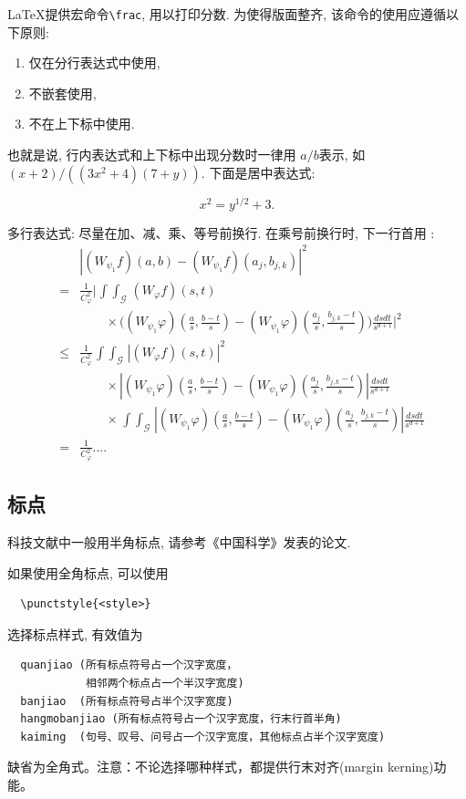\LaTeX 提供宏命令\verb+\frac+, 用以打印分数. 为使得版面整齐, 该命令的使用应遵循以下原则:

\begin{enumerate}
\item 仅在分行表达式中使用,
\item 不嵌套使用,
\item 不在上下标中使用.
\end{enumerate}

也就是说, 行内表达式和上下标中出现分数时一律用 $a/b$表示, 如
$(x+2)/((3x^2+4)(7+y))$. 下面是居中表达式:

\[
 x^2 = y^{1/2} +3.
\]

多行表达式: 尽量在加、减、乘、等号前换行. 在乘号前换行时,
下一行首用 \string\times:
\def\iint{\mathop{\int\!\!\!\int}}\def\calG{\mathcal G}
\begin{eqnarray}
&&\left|(W_{\psi_1}f)(a,b)-(W_{\psi_1}f)(a_j,b_{j,k})\right|^{2}\nonumber\\
&=&\frac{1}{C^{2}_{\varphi}}\Bigg|\iint_{\calG} (W_{\varphi}f)(s,t) \nonumber\\
&&\qquad\times \Bigg( (W_{\psi_1}\varphi)\left(\frac{a}{s},
\frac{b-t}{s}\right)
     -(W_{\psi_1}\varphi)\left(\frac{a_{j}}{s}, \frac{b_{j,k}-t}{s}\right)\Bigg)
  \frac{dsdt}{s^{d+1}}\Bigg|^2 \nonumber\\
&\le& \frac{1}{C^2_{\varphi}} \iint_{\calG} |(W_{\varphi}f)(s,t)|^2 \nonumber\\
&&\qquad \times\left| (W_{\psi_1}\varphi)\left(\frac{a}{s},
\frac{b-t}{s}\right)
    -(W_{\psi_1}\varphi)\left(\frac{a_{j}}{s}, \frac{b_{j,k}-t}{s}\right)\right|
   \frac{dsdt}{s^{d+1}}  \nonumber\\
&&\qquad \times   \iint_{\calG}\!
 \left|(W_{\psi_1}\varphi)\left(\frac{a}{s}, \frac{b-t}{s}\right)
    -(W_{\psi_1}\varphi)\left(\frac{a_{j}}{s}, \frac{b_{j,k}-t}{s}\right)\right|
 \frac{ ds dt}{s^{d+1}} \nonumber\\
&=& \frac{1}{C^2_{\varphi}} ....  \label{eq:a0}
\end{eqnarray}


\subsection{标点}
科技文献中一般用半角标点, 请参考《中国科学》发表的论文.

如果使用全角标点, 可以使用
\begin{verbatim}
  \punctstyle{<style>}
\end{verbatim}
选择标点样式, 有效值为
\begin{verbatim}
  quanjiao (所有标点符号占一个汉字宽度，
            相邻两个标点占一个半汉字宽度)
  banjiao  (所有标点符号占半个汉字宽度)
  hangmobanjiao (所有标点符号占一个汉字宽度，行末行首半角)
  kaiming  (句号、叹号、问号占一个汉字宽度，其他标点占半个汉字宽度)
\end{verbatim}
缺省为全角式。注意：不论选择哪种样式，都提供行末对齐(margin kerning)功能。



